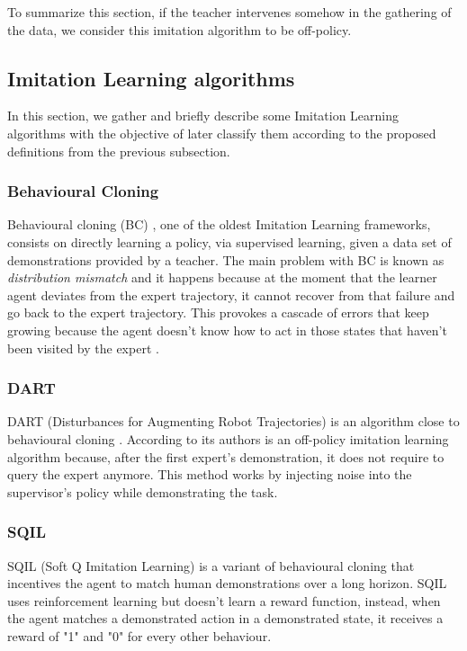 To summarize this section, if the teacher intervenes somehow  in the gathering of the data, we consider this imitation algorithm to be off-policy.

\subsection{Imitation Learning algorithms}

In this section, we gather and briefly describe some Imitation Learning algorithms with the objective of later classify them according to the proposed definitions from the previous subsection.




\subsubsection*{Behavioural Cloning}
Behavioural cloning (BC) \cite{Behavioural-Cloning-Pomerleau:1991}, one of the oldest Imitation Learning frameworks, consists on directly learning a policy, via supervised learning, given a data set of demonstrations provided by a teacher. The main problem with BC is known as \textit{distribution mismatch} and it happens because at the moment that the learner agent deviates from the expert trajectory, it cannot recover from that failure and go back to the expert trajectory. This provokes a cascade of errors that keep growing because the agent doesn't know how to act in those states that haven't been visited by the expert \cite{Global-overview-Attia:2018}.

\subsubsection*{DART}
DART (Disturbances for Augmenting Robot Trajectories) \cite{DART-Laskey:2017} is an algorithm close to behavioural cloning \cite{Behavioural-Cloning-Pomerleau:1991}. According to its authors is an off-policy imitation learning algorithm because, after the first expert's demonstration, it does not require to query the expert anymore. This method works by injecting noise into the supervisor's policy while demonstrating the task.

\subsubsection*{SQIL}
SQIL (Soft Q Imitation Learning) \cite{SQIL-Reddy-Dragan-Levine:2019} is a variant of behavioural cloning that incentives the agent to match human demonstrations over a long horizon. SQIL uses reinforcement learning but doesn't learn a reward function, instead, when the agent matches a demonstrated action in a demonstrated state, it receives a reward of "1" and "0" for every other behaviour.

